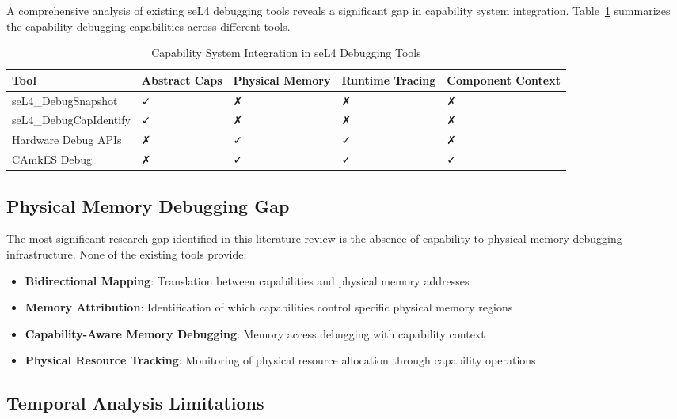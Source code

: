 \documentclass[11pt,a4paper]{article}
\begin{document}
\begin{subsubsection}
A comprehensive analysis of existing seL4 debugging tools reveals a significant gap in capability system integration. Table~\ref{tab:capability-integration} summarizes the capability debugging capabilities across different tools.

\begin{table}[htbp]
\centering
\caption{Capability System Integration in seL4 Debugging Tools}
\label{tab:capability-integration}
\begin{tabular}{>{\raggedright}p{3cm}>{\centering}p{2.5cm}>{\centering}p{2.5cm}>{\centering}p{2.5cm}>{\centering}p{2.5cm}}
\toprule
\textbf{Tool} & \textbf{Abstract Caps} & \textbf{Physical Memory} & \textbf{Runtime Tracing} & \textbf{Component Context} \\
\midrule
seL4\_DebugSnapshot & ✓ & ✗ & ✗ & ✗ \\
seL4\_DebugCapIdentify & ✓ & ✗ & ✗ & ✗ \\
Hardware Debug APIs & ✗ & ✓ & ✓ & ✗ \\
CAmkES Debug & ✗ & ✓ & ✓ & ✓ \\
\bottomrule
\end{tabular}
\end{table}

\subsection{Physical Memory Debugging Gap}

The most significant research gap identified in this literature review is the absence of capability-to-physical memory debugging infrastructure. None of the existing tools provide:

\begin{itemize}
\item \textbf{Bidirectional Mapping}: Translation between capabilities and physical memory addresses
\item \textbf{Memory Attribution}: Identification of which capabilities control specific physical memory regions
\item \textbf{Capability-Aware Memory Debugging}: Memory access debugging with capability context
\item \textbf{Physical Resource Tracking}: Monitoring of physical resource allocation through capability operations
\end{itemize}

\subsection{Temporal Analysis Limitations}


\end{subsubsection}
\end{document}
